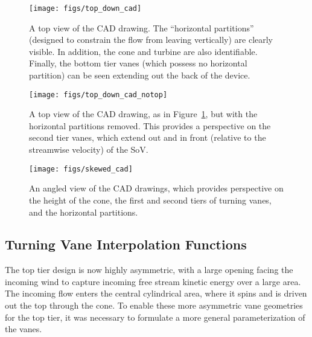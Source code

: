 \begin{figure}[!htb]
  \begin{center}
   \texttt{[image: figs/top\_down\_cad]}
   \caption{A top view of the CAD drawing. The ``horizontal partitions''
   (designed to constrain the flow from leaving vertically) are clearly
   visible. In addition, the cone and turbine are also
   identifiable. Finally, the bottom tier vanes (which possess no
   horizontal partition) can be seen extending out the back of the
   device.} 
   \label{fig:top_down_cad}
  \end{center}
 \end{figure}

\begin{figure}[!htb]
  \begin{center}
   \texttt{[image: figs/top\_down\_cad\_notop]}
   \caption{A top view of the CAD drawing, as in
   Figure~\ref{fig:top_down_cad}, but with the horizontal partitions
   removed. This provides a perspective on the second tier vanes, which
   extend out and in front (relative to the streamwise velocity) of the
   SoV.}
   \label{fig:top_down_cad_notop}
  \end{center}
 \end{figure}

\begin{figure}[!htb]
  \begin{center}
   \texttt{[image: figs/skewed\_cad]}
   \caption{An angled view of the CAD drawings, which provides
   perspective on the height of the cone, the first and second tiers of 
   turning vanes, and the horizontal partitions.}
   \label{fig:cad_skewed}
  \end{center}
 \end{figure}

\subsection{Turning Vane Interpolation Functions}
\label{sec:interpolate}

The top tier design is now highly asymmetric, with a
large opening facing the incoming wind to capture incoming free stream
kinetic energy over a large area. The incoming flow enters the central
cylindrical area, where it spins and is driven out the top through the
cone. To enable these more asymmetric vane geometries for the top tier,
it was necessary to formulate a more general parameterization of the
vanes.

